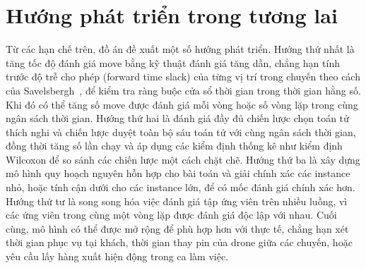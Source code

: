 \documentclass[../DoAn.tex]{subfiles}
\begin{document}
\section{Hướng phát triển trong tương lai}

Từ các hạn chế trên, đồ án đề xuất một số hướng phát triển. Hướng thứ nhất là tăng tốc độ đánh giá move bằng kỹ thuật đánh giá tăng dần, chẳng hạn tính trước độ trễ cho phép (forward time slack) của từng vị trí trong chuyến theo cách của Savelsbergh~\cite{savelsbergh1985local}, để kiểm tra ràng buộc cửa sổ thời gian trong thời gian hằng số. Khi đó có thể tăng số move được đánh giá mỗi vòng hoặc số vòng lặp trong cùng ngân sách thời gian. Hướng thứ hai là đánh giá đầy đủ chiến lược chọn toán tử thích nghi và chiến lược duyệt toàn bộ sáu toán tử với cùng ngân sách thời gian, đồng thời tăng số lần chạy và áp dụng các kiểm định thống kê như kiểm định Wilcoxon để so sánh các chiến lược một cách chặt chẽ. Hướng thứ ba là xây dựng mô hình quy hoạch nguyên hỗn hợp cho bài toán và giải chính xác các instance nhỏ, hoặc tính cận dưới cho các instance lớn, để có mốc đánh giá chính xác hơn. Hướng thứ tư là song song hóa việc đánh giá tập ứng viên trên nhiều luồng, vì các ứng viên trong cùng một vòng lặp được đánh giá độc lập với nhau. Cuối cùng, mô hình có thể được mở rộng để phù hợp hơn với thực tế, chẳng hạn xét thời gian phục vụ tại khách, thời gian thay pin của drone giữa các chuyến, hoặc yêu cầu lấy hàng xuất hiện động trong ca làm việc.
\end{document}
